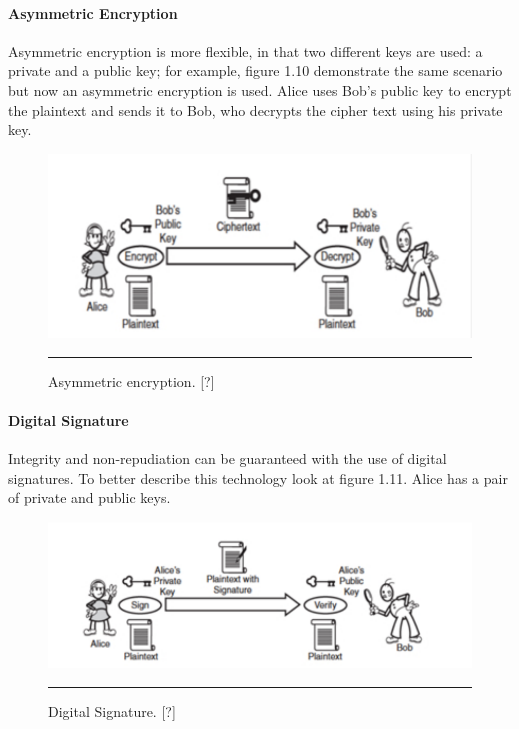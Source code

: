 \paragraph{Asymmetric Encryption}

Asymmetric encryption is more flexible, in that two different keys are used: a private and a public key; for example, figure 1.10 demonstrate the same scenario but now an asymmetric encryption is used. Alice uses Bob's public key to encrypt the plaintext and sends it to Bob, who decrypts the cipher text using his private key.

\begin{figure}[htbp]
	\centering
		\includegraphics{./Figures/figure13.pdf}
		\rule{35em}{0.5pt}
	\caption[Asymmetric Encryption]{Asymmetric encryption. [?]}
	\label{fig:asymmetricEncryption}
\end{figure}

\paragraph{Digital Signature}

Integrity and non-repudiation can be guaranteed with the use of digital signatures. To better describe this technology look at figure 1.11. Alice has a pair of private and public keys.

\begin{figure}[htbp]
	\centering
		\includegraphics{./Figures/figure14.pdf}
		\rule{35em}{0.5pt}
	\caption[Digital Signature]{Digital Signature. [?]}
	\label{fig:digitalSignature}
\end{figure}

